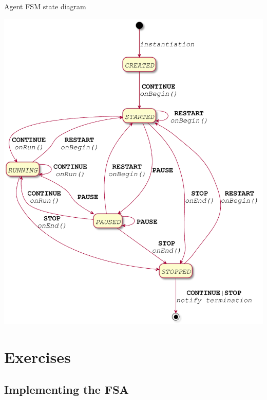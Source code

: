 \documentclass[presentation]{beamer}\mode<presentation>{\usetheme{AMSCesenaPurpleAndGold}}
\begin{document}
\begin{frame}[allowframebreaks]{Agent FSM state diagram}
    \begin{center}
        \includegraphics[height=.9\textheight]{img/fsa.pdf}
    \end{center}
    
\end{frame}

\section{Exercises}

\subsection{Implementing the FSA}
\end{document}
